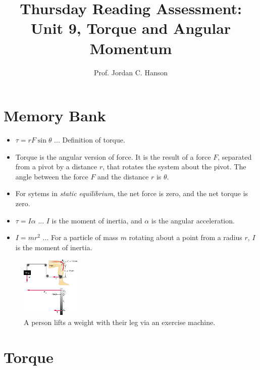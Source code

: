 \documentclass{article}
\begin{document}
\title{Thursday Reading Assessment: Unit 9, Torque and Angular Momentum}
\author{Prof. Jordan C. Hanson}

\maketitle

\section{Memory Bank}

\begin{itemize}
\item $\tau = r F \sin\theta$ ... Definition of torque.
\item Torque is the angular version of force.  It is the result of a force $F$, separated from a pivot by a distance $r$, that rotates the system about the pivot.  The angle between the force $F$ and the distance $r$ is $\theta$.
\item For sytems in \textit{static equilibrium}, the net force is zero, and the net torque is zero.
\item $\tau = I \alpha$ ... $I$ is the moment of inertia, and $\alpha$ is the angular acceleration.
\item $I = mr^2$ ... For a particle of mass $m$ rotating about a point from a radius $r$, $I$ is the moment of inertia.
\end{itemize}

\begin{figure}[ht]
\centering
\includegraphics[width=0.25\textwidth]{figures/muscle1.jpeg}
\caption{\label{fig:torque} A person lifts a weight with their leg via an exercise machine.}
\end{figure}

\section{Torque}
\end{document}
